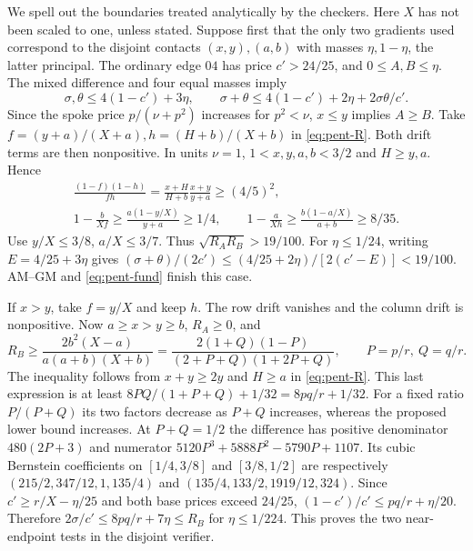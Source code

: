 \documentclass[11pt,a4paper]{article}
\theoremstyle{definition}
\begin{document}
We spell out the boundaries treated analytically by the checkers.
Here $X$ has not been scaled to one, unless stated. Suppose first that
the only two gradients used correspond to the disjoint contacts
$(x,y),(a,b)$ with masses $\eta,1-\eta$, the latter principal.
The ordinary edge $04$ has price $c'>24/25$, and $0\le A,B\le\eta$.
The mixed difference and four equal masses imply
\[
 \sigma,\theta\le4(1-c')+3\eta,\qquad
 \sigma+\theta\le 4(1-c')+2\eta+2\sigma\theta/c'.
\]
Since the spoke price $p/(\nu+p^2)$ increases for $p^2<\nu$,
$x\le y$ implies $A\ge B$. Take
$f=(y+a)/(X+a),h=(H+b)/(X+b)$ in \eqref{eq:pent-R}.
Both drift terms are then nonpositive. In units $\nu=1$,
$1<x,y,a,b<3/2$ and $H\ge y,a$. Hence
\[
 \begin{gathered}
 \frac{(1-f)(1-h)}{fh}
 =\frac{x+H}{H+b}\frac{x+y}{y+a}\ge(4/5)^2,\\
 1-\frac b{Xf}\ge\frac{a(1-y/X)}{y+a}\ge1/4,\qquad
 1-\frac a{Xh}\ge\frac{b(1-a/X)}{a+b}\ge8/35 .
 \end{gathered}
\]
Use $y/X\le3/8$, $a/X\le3/7$. Thus $\sqrt{R_A R_B}>19/100$.
For $\eta\le1/24$, writing $E=4/25+3\eta$ gives
$(\sigma+\theta)/(2c')\le(4/25+2\eta)/[2(c'-E)]<19/100$.
AM--GM and \eqref{eq:pent-fund} finish this case.

If $x>y$, take $f=y/X$ and keep $h$. The row drift vanishes and the
column drift is nonpositive. Now $a\ge x>y\ge b$, $R_A\ge0$, and
\[
 R_B\ge\frac{2b^2(X-a)}{a(a+b)(X+b)}
 =\frac{2(1+Q)(1-P)}{(2+P+Q)(1+2P+Q)},\qquad P=p/r,\ Q=q/r .
\]
The inequality follows from $x+y\ge2y$ and $H\ge a$ in
\eqref{eq:pent-R}. This last expression is at least
$8PQ/(1+P+Q)+1/32=8pq/r+1/32$. For a fixed ratio $P/(P+Q)$ its two
factors decrease as $P+Q$ increases, whereas the proposed lower bound
increases. At $P+Q=1/2$ the difference has positive denominator
$480(2P+3)$ and numerator
$5120P^3+5888P^2-5790P+1107$. Its cubic Bernstein coefficients on
$[1/4,3/8]$ and $[3/8,1/2]$ are respectively
$(215/2,347/12,1,135/4)$ and $(135/4,133/2,1919/12,324)$.
Since $c'\ge r/X-\eta/25$ and both base prices exceed $24/25$,
$(1-c')/c'\le pq/r+\eta/20$. Therefore
$2\sigma/c'\le8pq/r+7\eta\le R_B$ for $\eta\le1/224$.
This proves the two near-endpoint tests in the disjoint verifier.
\end{document}
